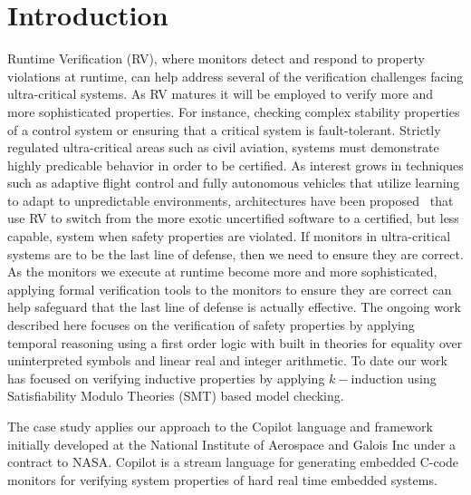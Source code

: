 \section{Introduction}\label{sec:intro}
Runtime Verification (RV), where monitors detect and respond to
property violations at runtime, can help address several of the
verification challenges facing ultra-critical systems.  As RV matures
 it will be employed to verify more and more sophisticated
properties. For instance, checking complex stability properties of a
control system or ensuring that a critical system is
fault-tolerant.  Strictly regulated ultra-critical areas such
as civil aviation, systems must demonstrate highly predicable behavior
in order to be certified. As interest grows in techniques such as
adaptive flight control and fully autonomous vehicles that utilize
learning to adapt to unpredictable environments, architectures have
been proposed~\cite{XX} that use RV to switch from the more exotic
uncertified software to a certified, but less capable, system when
safety properties are violated. If monitors in ultra-critical systems
are to be the last line of defense, then we need to ensure they are
correct.  As the monitors  we execute at runtime become more and more
sophisticated, applying formal verification tools to the monitors to
ensure they are correct can help safeguard that the last line of
defense is actually effective. The ongoing work described here focuses
on the verification of safety properties by applying temporal
reasoning using a first order logic with built in theories for
equality over uninterpreted symbols and linear real and integer
arithmetic. To date our work has focused on verifying inductive
properties by applying  $k-$induction  using Satisfiability Modulo Theories (SMT)
based model checking.  

  The case study applies our approach to the Copilot language and
  framework initially developed at the National Institute of Aerospace
  and Galois Inc under a contract to NASA.  Copilot is a stream
  language for generating embedded C-code monitors for verifying
  system properties of hard real time embedded systems. 



  








